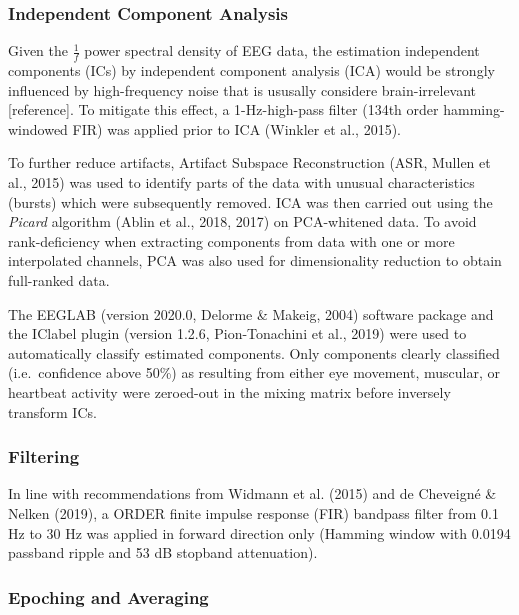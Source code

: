 \documentclass[stu,a4paper,11pt,floatsintext]{apa7}
\begin{document}
\hypertarget{independent-component-analysis}{%
\subsubsection{Independent Component
Analysis}\label{independent-component-analysis}}

Given the \(\frac{1}{f}\) power spectral density of EEG data, the
estimation independent components (ICs) by independent component
analysis (ICA) would be strongly influenced by high-frequency noise that
is ususally considere brain-irrelevant {[}reference{]}. To mitigate this
effect, a 1-Hz-high-pass filter (134th order hamming-windowed FIR) was
applied prior to ICA (Winkler et al., 2015).

To further reduce artifacts, Artifact Subspace Reconstruction (ASR,
Mullen et al., 2015) was used to identify parts of the data with unusual
characteristics (bursts) which were subsequently removed. ICA was then
carried out using the \emph{Picard} algorithm (Ablin et al., 2018, 2017)
on PCA-whitened data. To avoid rank-deficiency when extracting
components from data with one or more interpolated channels, PCA was
also used for dimensionality reduction to obtain full-ranked data.

The EEGLAB (version 2020.0, Delorme \& Makeig, 2004) software package
and the IClabel plugin (version 1.2.6, Pion-Tonachini et al., 2019) were
used to automatically classify estimated components. Only components
clearly classified (i.e.~confidence above 50\%) as resulting from either
eye movement, muscular, or heartbeat activity were zeroed-out in the
mixing matrix before inversely transform ICs.

\hypertarget{filtering}{%
\subsubsection{Filtering}\label{filtering}}

In line with recommendations from Widmann et al. (2015) and de Cheveigné
\& Nelken (2019), a ORDER finite impulse response (FIR) bandpass filter
from 0.1 Hz to 30 Hz was applied in forward direction only (Hamming
window with 0.0194 passband ripple and 53 dB stopband attenuation).

\hypertarget{epoching-and-averaging}{%
\subsubsection{Epoching and Averaging}\label{epoching-and-averaging}}
\end{document}
